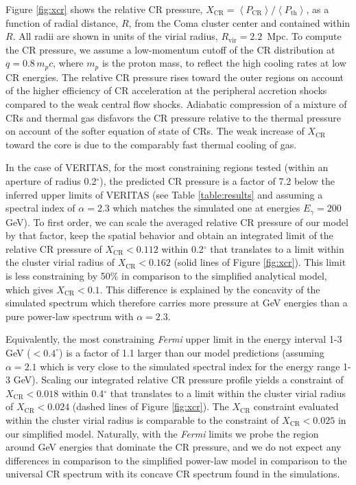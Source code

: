 \documentclass[12pt,manuscript]{aastex}
\def\Fermi{{\em Fermi}\xspace}
\newcommand{\expval}[1]{\left\langle #1 \right\rangle}
\newcommand{\rmn}{\mathrm}
\newcommand{\CR}{\mathrm{CR}}
\begin{document}
Figure \ref{fig:xcr} shows the relative CR pressure, $X_{\CR} =
\expval{P_{\CR}}/\expval{P_\rmn{th}}$, as a function of radial distance, $R$, from the Coma cluster
center and contained within $R$. All radii are shown in units of the virial radius,
$R_\rmn{vir}=2.2$~Mpc. To compute the CR pressure, we assume a low-momentum cutoff of the CR
distribution at $q = 0.8\,m_{p}c$, where $m_{p}$ is the proton mass, to reflect the high cooling
rates at low CR energies. The relative
CR pressure rises toward the outer regions on account of the higher efficiency of CR acceleration at
the peripheral accretion shocks compared to the weak central flow shocks. Adiabatic compression of a
mixture of CRs and thermal gas disfavors the CR pressure relative to the thermal pressure on
account of the softer equation of state of CRs. The weak increase of $X_{\CR}$ toward the core is
due to the comparably fast thermal cooling of gas.

In the case of VERITAS, for the most constraining regions tested (within an aperture of radius
0.2$^{\circ}$), the predicted CR pressure is a factor of 7.2 below the inferred upper limits of
VERITAS (see Table \ref{table:results} and assuming a spectral index of $\alpha=2.3$ which matches
the simulated one at energies $E_\gamma=200$ GeV). To first order, we can scale the averaged
relative CR pressure of our model by that factor, keep the spatial behavior and obtain an integrated
limit of the relative CR pressure of $X_{\CR}<0.112$ within 0.2$^{\circ}$ that translates to a limit
within the cluster virial radius of $X_\CR<0.162$ (solid lines of Figure \ref{fig:xcr}). This limit
is less constraining by 50\% in comparison to the simplified analytical model, which gives
$X_\CR<0.1$. This difference is explained by the concavity of the simulated spectrum which therefore
carries more pressure at GeV energies than a pure power-law spectrum with $\alpha=2.3$.

Equivalently, the most constraining \Fermi upper limit in the energy interval 1-3 GeV
($<0.4^\circ$) is a factor of 1.1 larger than our model predictions (assuming $\alpha=2.1$ which is
very close to the simulated spectral index for the energy range 1-3 GeV). Scaling our integrated
relative CR pressure profile yields a constraint of $X_{\CR}<0.018$ within 0.4$^{\circ}$ that
translates to a limit within the cluster virial radius of $X_\CR<0.024$ (dashed lines of Figure
\ref{fig:xcr}). The $X_\CR$ constraint evaluated within the cluster virial radius is comparable to
the constraint of $X_\CR<0.025$ in our simplified model. Naturally, with the \Fermi limits we probe
the region around GeV energies that dominate the CR pressure, and we do not expect any differences
in comparison to the simplified power-law model in comparison to the universal CR spectrum with its
concave CR spectrum found in the simulations.
\end{document}
